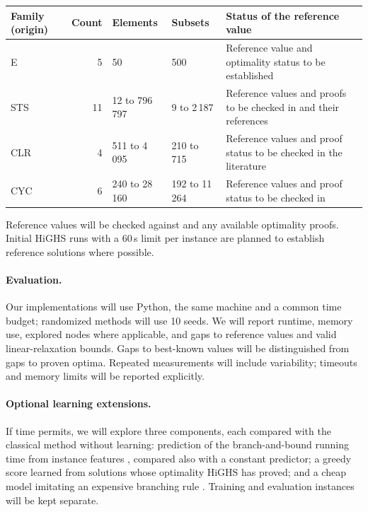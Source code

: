 \documentclass[a4paper,11pt]{article}
\renewcommand{\arraystretch}{1.15}
\begin{document}
\begin{table}[H]
\centering
\small
\renewcommand{\arraystretch}{1.2}
\setlength{\extrarowheight}{2pt}
\begin{tabularx}{\textwidth}{|l|r|l|l|L|}
\hline
\textbf{Family (origin)} & \textbf{Count} & \textbf{Elements} & \textbf{Subsets} & \textbf{Status of the reference value} \\
\hline
E & 5 & 50 & 500 & Reference value and optimality status to be established \\
\hline
STS \cite{fulkerson1974} & 11 & 12 to 796\,797 & 9 to 2\,187 & Reference values and proofs to be checked in \cite{ostrowski2011,pinard2020} and their references \\
\hline
CLR \cite{grossman1997} & 4 & 511 to 4\,095 & 210 to 715 & Reference values and proof status to be checked in the literature \\
\hline
CYC \cite{grossman1997} & 6 & 240 to 28\,160 & 192 to 11\,264 & Reference values and proof status to be checked in \cite{gao2015,pinard2020} \\
\hline
\end{tabularx}
\end{table}

Reference values will be checked against \cite{kritter2019,pinard2020} and any available optimality proofs. Initial HiGHS runs with a 60\,s limit per instance are planned to establish reference solutions where possible.

\paragraph{Evaluation.} Our implementations will use Python, the same machine and a common time budget; randomized methods will use 10 seeds. We will report runtime, memory use, explored nodes where applicable, and gaps to reference values and valid linear-relaxation bounds. Gaps to best-known values will be distinguished from gaps to proven optima. Repeated measurements will include variability; timeouts and memory limits will be reported explicitly.

\paragraph{Optional learning extensions.} If time permits, we will explore three components, each compared with the classical method without learning: prediction of the branch-and-bound running time from instance features \cite{leytonbrown2009}, compared also with a constant predictor; a greedy score learned from solutions whose optimality HiGHS has proved; and a cheap model imitating an expensive branching rule \cite{khalil2016}. Training and evaluation instances will be kept separate.
\end{document}

